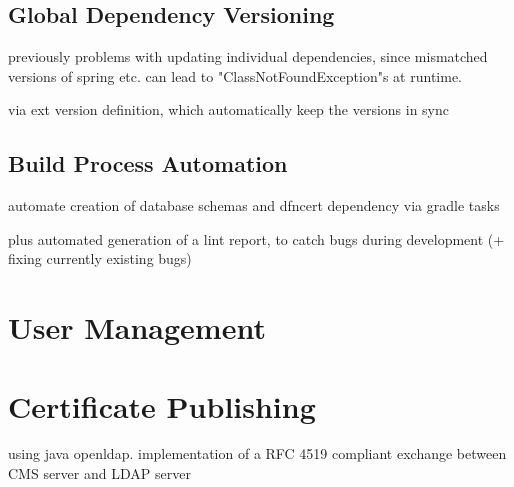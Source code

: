 \subsection{Global Dependency Versioning}
previously problems with updating individual dependencies, since mismatched versions of spring etc. can lead to
"ClassNotFoundException"s at runtime.

via ext version definition, which automatically keep the versions in sync
\subsection{Build Process Automation}
automate creation of database schemas and dfncert dependency via gradle tasks

plus automated generation of a lint report, to catch bugs during development (+ fixing currently existing bugs)

\section{User Management}

\section{Certificate Publishing}
using java openldap. implementation of a RFC 4519 compliant exchange between CMS server and LDAP server

\subsection{}

